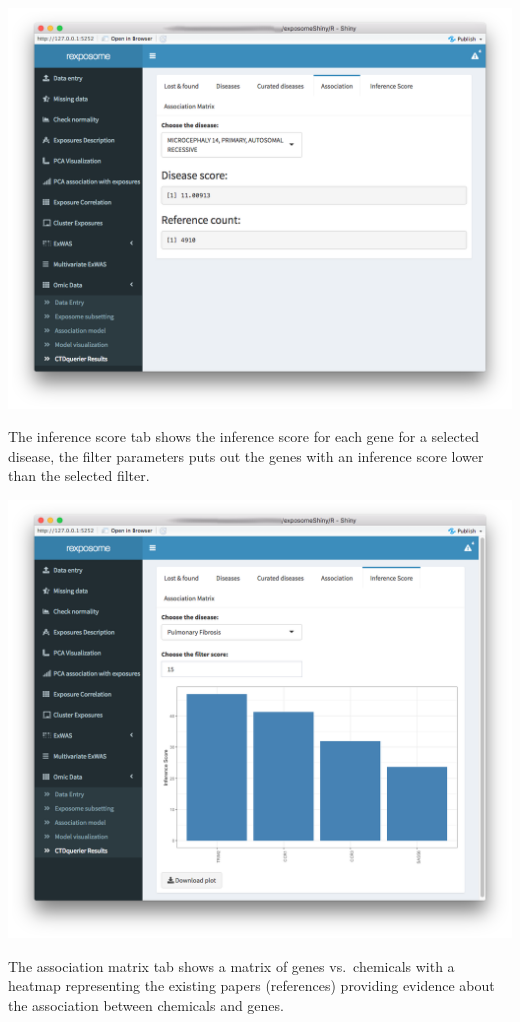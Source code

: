 \documentclass[
]{book}
\begin{document}
\includegraphics{images/analysis10_7.png}

The inference score tab shows the inference score for each gene for a selected disease, the filter parameters puts out the genes with an inference score lower than the selected filter.

\includegraphics{images/analysis10_8.png}

The association matrix tab shows a matrix of genes vs.~chemicals with a heatmap representing the existing papers (references) providing evidence about the association between chemicals and genes.
\end{document}

